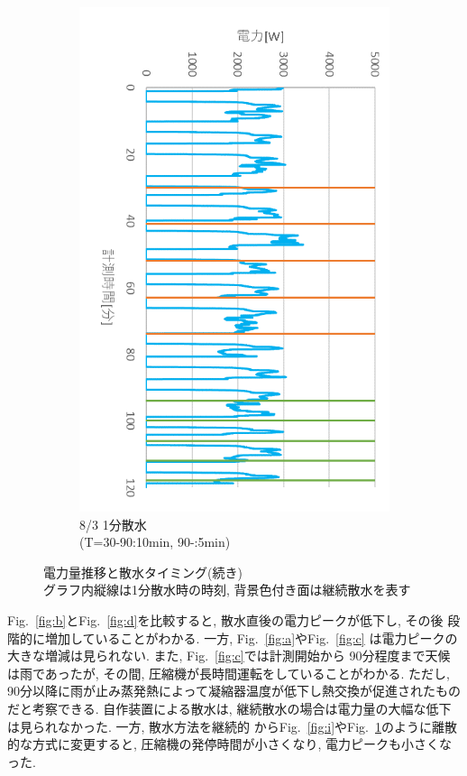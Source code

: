 \documentclass[a4j,fleqn,dvipdfmx,uplatex]{jsarticle}
\newcommand{\figref}[1]{Fig.\ \ref{#1}}
\begin{document}
\begin{figure}[htb]
\begin{subfigure}[t]{0.32\linewidth}
    \includegraphics[width=\linewidth]{img/t_p/20220803.png}
    \caption{8/3 1分散水\\ \small (T=30-90:10min, 90-:5min)}\label{fig:j}
  \end{subfigure}
  \caption{電力量推移と散水タイミング(続き)\\ \small グラフ内縦線は1分散水時の時刻, 背景色付き面は継続散水を表す}\label{fig:ex_outputs_2/2}
\end{figure}

\figref{fig:b}と\figref{fig:d}を比較すると, 散水直後の電力ピークが低下し, その後
段階的に増加していることがわかる. 一方, \figref{fig:a}や\figref{fig:c}
は電力ピークの大きな増減は見られない. また, \figref{fig:c}では計測開始から
90分程度まで天候は雨であったが, その間, 圧縮機が長時間運転をしていることがわかる. 
ただし, 90分以降に雨が止み蒸発熱によって凝縮器温度が低下し熱交換が促進されたものだと考察できる. 
自作装置による散水は, 継続散水の場合は電力量の大幅な低下は見られなかった. 一方, 散水方法を継続的
から\figref{fig:i}や\figref{fig:j}のように離散的な方式に変更すると, 圧縮機の発停時間が小さくなり, 
電力ピークも小さくなった. 
\end{document}
